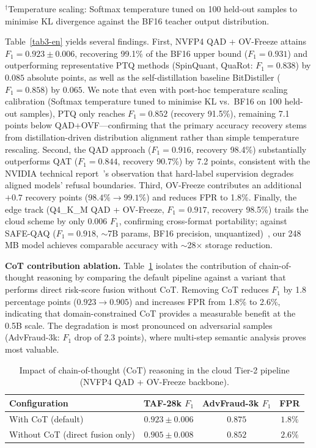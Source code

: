 \documentclass[11pt, a4paper]{article}
\begin{document}
\begin{table}[h]
\vspace{4pt}
\noindent\footnotesize $^\dagger$Temperature scaling: Softmax temperature tuned on 100 held-out samples to minimise KL divergence against the BF16 teacher output distribution.
\end{table}

Table~\ref{tab3-en} yields several findings. First, NVFP4 QAD + OV-Freeze attains $F_1 = 0.923 \pm 0.006$, recovering 99.1\% of the BF16 upper bound ($F_1 = 0.931$) and outperforming representative PTQ methods (SpinQuant, QuaRot: $F_1 = 0.838$) by $0.085$ absolute points, as well as the self-distillation baseline BitDistiller ($F_1 = 0.858$) by $0.065$. We note that even with post-hoc temperature scaling calibration (Softmax temperature tuned to minimise KL vs.\ BF16 on 100 held-out samples), PTQ only reaches $F_1 = 0.852$ (recovery 91.5\%), remaining 7.1 points below QAD+OVF---confirming that the primary accuracy recovery stems from distillation-driven distribution alignment rather than simple temperature rescaling. Second, the QAD approach ($F_1 = 0.916$, recovery 98.4\%) substantially outperforms QAT ($F_1 = 0.844$, recovery 90.7\%) by 7.2 points, consistent with the NVIDIA technical report~\cite{3}'s observation that hard-label supervision degrades aligned models' refusal boundaries. Third, OV-Freeze contributes an additional $+0.7$ recovery points ($98.4\%\!\rightarrow\!99.1\%$) and reduces FPR to 1.8\%. Finally, the edge track (Q4\_K\_M QAD + OV-Freeze, $F_1 = 0.917$, recovery 98.5\%) trails the cloud scheme by only 0.006 $F_1$, confirming cross-format portability; against SAFE-QAQ ($F_1 = 0.918$, $\sim$7B params, BF16 precision, unquantized)~\cite{2}, our 248\,MB model achieves comparable accuracy with $\sim$28$\times$ storage reduction.

\medskip
\noindent\textbf{CoT contribution ablation.} Table~\ref{tab:cot-ablation-en} isolates the contribution of chain-of-thought reasoning by comparing the default pipeline against a variant that performs direct risk-score fusion without CoT. Removing CoT reduces $F_1$ by 1.8 percentage points ($0.923\!\rightarrow\!0.905$) and increases FPR from 1.8\% to 2.6\%, indicating that domain-constrained CoT provides a measurable benefit at the 0.5B scale. The degradation is most pronounced on adversarial samples (AdvFraud-3k: $F_1$ drop of 2.3 points), where multi-step semantic analysis proves most valuable.

\begin{table}[htbp]
\centering
\caption{Impact of chain-of-thought (CoT) reasoning in the cloud Tier-2 pipeline (NVFP4 QAD + OV-Freeze backbone).}
\label{tab:cot-ablation-en}
\small
\renewcommand{\arraystretch}{1.2}
\begin{tabular}{lccc}
\toprule
\textbf{Configuration} & \textbf{TAF-28k $F_1$} & \textbf{AdvFraud-3k $F_1$} & \textbf{FPR} \\
\midrule
With CoT (default) & $\mathbf{0.923 \pm 0.006}$ & $\mathbf{0.875}$ & $\mathbf{1.8\%}$ \\
Without CoT (direct fusion only) & $0.905 \pm 0.008$ & $0.852$ & $2.6\%$ \\
\bottomrule
\end{tabular}
\end{table}
\end{document}
